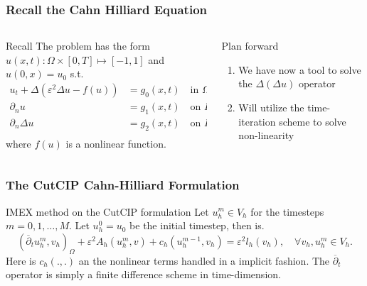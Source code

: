 \begin{frame}
\frametitle{Recall the Cahn Hilliard Equation}
    \begin{columns}
        \begin{column}{0.5\textwidth}
            \begin{block}{Recall}
                The problem has the form $u( x, t): \Omega \times [0,T] \mapsto [-1,1]$ and $u(0,x)  =u_0$ s.t.
                \[
                \begin{split}
                    u_t+\Delta\left(\varepsilon ^2 \Delta u- f(u)\right)&= g_0(x,t) \quad \text{in } \Omega \\
                    \partial_n u & =g_1(x,t) \quad \text{on } \Gamma  \\
                    \partial_n \Delta u& =g_2(x,t) \quad \text{on } \Gamma  \\
                \end{split}
                \]
                where $f(u)$ is a nonlinear function.
            \end{block}
        \end{column}
        \begin{column}{0.5\textwidth}
            \begin{block}{Plan forward}
                \begin{enumerate}
                    \item We have now a tool to solve the $\Delta ( \Delta u) $ operator
                    \item Will utilize the time-iteration scheme to solve non-linearity
                \end{enumerate}
            \end{block}
        \end{column}
    \end{columns}
\end{frame}




\begin{frame}
\frametitle{The CutCIP Cahn-Hilliard Formulation}


\begin{block}{IMEX method on the CutCIP formulation}
    Let $u^{m}_{h} \in V_{h}$ for the timesteps $m=0,1,\ldots,M$. Let $u_{h}^{0} = u_{0}$ be the initial timestep, then is.
\begin{equation}
( \overline{\partial } _{t} u^{m}_{h}, v_{h}   )_{\Omega } + \varepsilon^{2} A^{}_{h}( u_{h}^{m} , v) +  c_{h} (  u_{h}^{m-1}, v_{h})  = \varepsilon ^2 l_{h}^{}( v_{h})  , \quad \forall v_{h}, u^{m}_{h} \in V^{}_{h}.
\end{equation}
Here is $c_{h}( . , .) $ an the nonlinear terms handled in a implicit fashion. The $ \overline{\partial}  _{t}$ operator is simply a finite difference scheme in time-dimension.

\end{block}

\end{frame}


